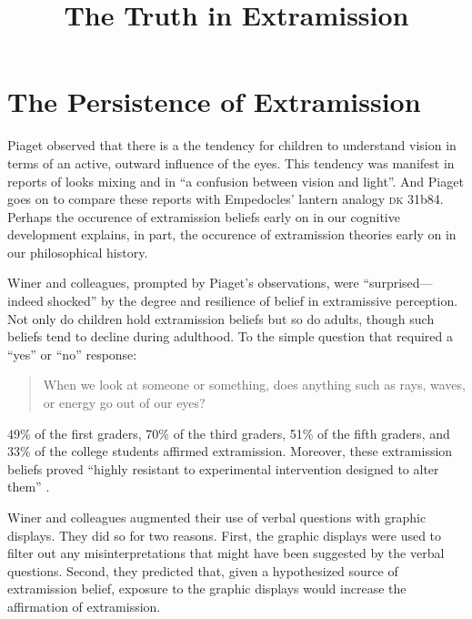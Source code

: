 \documentclass[12pt]{article}
\title{The Truth in Extramission}
\author{\myauthor}
\date{} %
\begin{document}
\maketitle

\setlength{\parindent}{1em}


\section{The Persistence of Extramission} %
\label{sec:the_persistence_of_extramission}

Piaget observed that there is a the tendency for children to understand vision in terms of an active, outward influence of the eyes. This tendency was manifest in reports of looks mixing and in ``a confusion between vision and light''. And Piaget goes on to compare these reports with Empedocles' lantern analogy \textsc{dk} 31b84. Perhaps the occurence of extramission beliefs early on in our cognitive development explains, in part, the occurence of extramission theories early on in our philosophical history. 

Winer and colleagues, prompted by Piaget's observations, were ``sur\-pri\-sed---indeed shocked'' by the degree and resilience of belief in extramissive perception. Not only do children hold extramission beliefs but so do adults, though such beliefs tend to decline during adulthood. To the simple question that required a ``yes'' or ``no'' response:
\begin{quote}
	When we look at someone or something, does anything such as rays, waves, or energy go out of our eyes?
\end{quote}
49\% of the first graders, 70\% of the third graders, 51\% of the fifth graders, and 33\% of the college students affirmed extramission. Moreover, these extramission beliefs proved ``highly resistant to experimental intervention designed to alter them'' . 

Winer and colleagues augmented their use of verbal questions with graphic displays. They did so for two reasons. First, the graphic displays were used to filter out any misinterpretations that might have been suggested by the verbal questions. Second, they predicted that, given a hypothesized source of extramission belief, exposure to the graphic displays would increase the affirmation of extramission.
\end{document}
